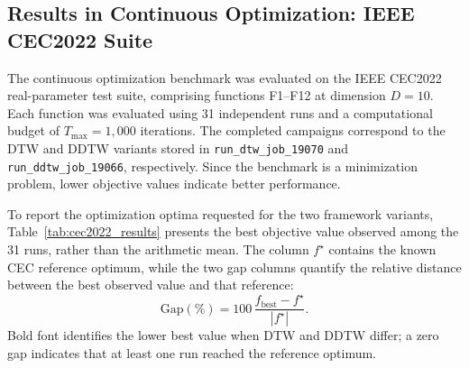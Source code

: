 
\subsection{Results in Continuous Optimization: IEEE CEC2022 Suite}
\label{sec:results_cec2022}

The continuous optimization benchmark was evaluated on the IEEE CEC2022
real-parameter test suite, comprising functions F1--F12 at dimension $D=10$.
Each function was evaluated using 31 independent runs and a computational
budget of $T_{\max}=1{,}000$ iterations. The completed campaigns correspond
to the DTW and DDTW variants stored in
\texttt{run\_dtw\_job\_19070} and \texttt{run\_ddtw\_job\_19066},
respectively. Since the benchmark is a minimization problem, lower objective
values indicate better performance.

To report the optimization optima requested for the two framework variants,
Table~\ref{tab:cec2022_results} presents the best objective value observed
among the 31 runs, rather than the arithmetic mean. The column $f^\star$
contains the known CEC reference optimum, while the two gap columns quantify
the relative distance between the best observed value and that reference:
\[
\mathrm{Gap}(\%) =
100\,\frac{f_{\mathrm{best}}-f^\star}{|f^\star|}.
\]
Bold font identifies the lower best value when DTW and DDTW differ; a zero
gap indicates that at least one run reached the reference optimum.

